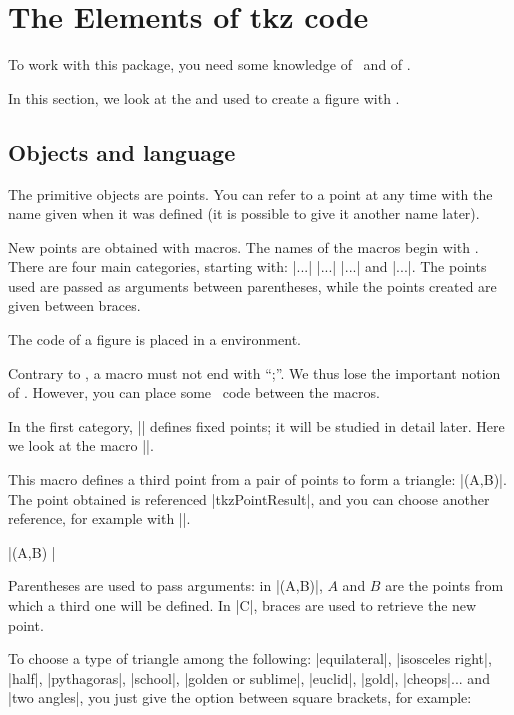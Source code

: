 \section{The Elements of tkz code}

To work with this package, you need some knowledge of \LATEX\ and of \TIKZ.

In this section, we look at the  and  used to create a figure with \tkzname{\tkznameofpack}.

\subsection{Objects and language}

 The primitive objects are points. You can refer to a point at any time with the name given when it was defined (it is possible to give it another name later).

New points are obtained with macros. The names of the \tkzname{\tkznameofpack} macros begin with . There are four main categories, starting with:
|\tkzDef...| |\tkzDraw...| |\tkzMark...| and |\tkzLabel...|. 
The points used are passed as arguments between parentheses, while the points created are given between braces.

The code of a figure is placed in a  environment.


Contrary to \TIKZ, a macro must not end with “;”. We thus lose the important notion of . However, you can place some \TIKZ\ code between the \tkzname{\tkznameofpack} macros.
 

In the first category, |\tkzDefPoint| defines fixed points; it will be studied in detail later. Here we look at the macro |\tkzDefTriangle|.

This macro defines a third point from a pair of points to form a triangle: |\tkzDefTriangle(A,B)|. The point obtained is referenced |tkzPointResult|, and you can choose another reference, for example with ||.

|\tkzDefTriangle[euclid](A,B) |

Parentheses are used to pass arguments: in |(A,B)|, $A$ and $B$ are the points from which a third one will be defined. In |{C}|, braces are used to retrieve the new point.

To choose a type of triangle among the following:
  |equilateral|,  |isosceles right|, |half|, |pythagoras|, |school|, |golden or sublime|, |euclid|, |gold|, |cheops|...
 and |two angles|, you just give the option between square brackets, for example:
 
